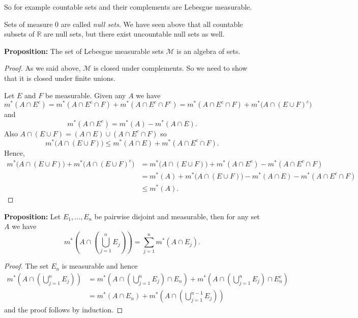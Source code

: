 \documentclass[12pt]{book}
\newcommand{\R}{{\mathbb{R}}}
\newcommand{\sM}{{\mathcal{M}}}
\theoremstyle{plain}
\theoremstyle{remark}
\theoremstyle{definition}
\theoremstyle{exercise}
\theoremstyle{example}
\begin{document}
\medskip

So for example countable sets and their complements are Lebesgue measurable.

\medskip

Sets of measure 0 are called \emph{null sets}.  We have seen above that all
countable subsets of $\R$ are null sets, but there exist 
uncountable null sets as well.

\medskip

\textbf{Proposition:}
The set of Lebesgue measurable sets
$\sM$ is an algebra of sets.

\medskip

\begin{proof}
As we said above, $\sM$ is closed under complements.  So we need to show that
it is closed under finite unions.

Let $E$ and $F$ be measurable.
Given any $A$ we have
$$
m^*(A \cap E^c) =
m^*(A \cap E^c \cap F) +
m^*(A \cap E^c \cap F^c)
=
m^*(A \cap E^c \cap F) +
m^*\bigl(A \cap ( E \cup F)^c \bigr)
$$
and
$$
m^*(A \cap E^c)
=
m^*(A) -
m^*(A \cap E) .
$$
Also
$A \cap (E \cup F) = (A \cap E) \cup (A \cap E^c \cap F)$ so
$$
m^*\bigl(A \cap (E \cup F) \bigr)
\leq
m^*(A \cap E ) +
m^*(A \cap E^c \cap F ) .
$$
Hence,
\begin{equation*}
\begin{split}
m^*\bigl(A \cap (E \cup F) \bigr) +
m^*\bigl(A \cap (E \cup F)^c \bigr)
& =
m^*\bigl(A \cap (E \cup F) \bigr) +
m^*(A \cap E^c ) -
m^*(A \cap E^c \cap F )
\\
& =
m^*(A)
+
m^*\bigl(A \cap (E \cup F) \bigr)
-
m^*(A \cap E ) -
m^*(A \cap E^c \cap F )
\\
& \leq
m^*(A) .
\end{split}
\end{equation*}
\end{proof}

\medskip

\textbf{Proposition:}
Let $E_1, \ldots, E_n$ be pairwise disjoint and measurable, then
for any set $A$ we have
$$
m^*\left( A \cap \left( \bigcup_{j=1}^n E_j \right) \right)
=
\sum_{j=1}^n
m^*( A \cap  E_j ) .
$$

\medskip

\begin{proof}
The set $E_n$ is measurable and hence
\begin{equation*}
\begin{split}
m^*\left( A \cap \left( \bigcup_{j=1}^n E_j \right) \right)
& =
m^*\left( A \cap \left( \bigcup_{j=1}^n E_j \right) \cap E_n \right)
+
m^*\left( A \cap \left( \bigcup_{j=1}^n E_j \right) \cap E_n^c \right)
\\
& =
m^*( A \cap E_n )
+
m^*\left( A \cap \left( \bigcup_{j=1}^{n-1} E_j \right) \right)
\end{split}
\end{equation*}
and the proof follows by induction.
\end{proof}
\end{document}
